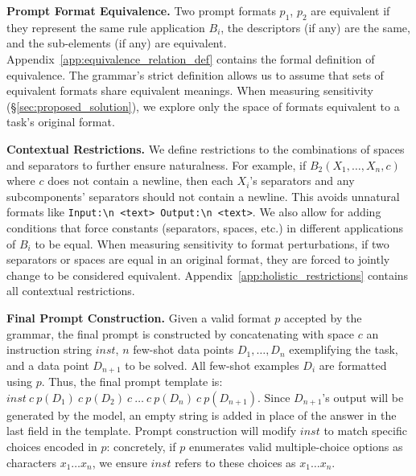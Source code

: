 \documentclass{article} %
\newcommand{\prompt}[1]{{\small{\texttt{#1}}}}
\renewcommand{\paragraph}[1]{\textbf{#1}}
\begin{document}
\paragraph{Prompt Format Equivalence.} 
Two prompt formats $p_1$, $p_2$ are equivalent if they represent the same rule application $B_i$, the descriptors (if any) are the same, and the sub-elements (if any) are equivalent. 
Appendix~\ref{app:equivalence_relation_def} contains the formal definition of equivalence. 
The grammar's strict definition allows us to assume that sets of equivalent formats share equivalent meanings. 
When measuring sensitivity (\S\ref{sec:proposed_solution}), we explore only the space of formats equivalent to a task's original format. 


\paragraph{Contextual Restrictions.} We define restrictions to the combinations of spaces and separators to further ensure naturalness. For example, if $B_2(X_1,\!\ldots,\!X_n,\!c)$ where $c$ does not contain a newline, then each $X_i$'s separators and any subcomponents' separators should not contain a newline. 
This avoids unnatural formats like \prompt{Input:\textbackslash n <text> Output:\textbackslash n <text>}. 
We also allow for adding conditions that force constants (separators, spaces, etc.) in different applications of $B_i$ to be equal. When measuring sensitivity to format perturbations, if two separators or spaces are equal in an original format, they are forced to jointly change to be considered equivalent. 
Appendix~\ref{app:holistic_restrictions} contains all contextual restrictions.

\paragraph{Final Prompt Construction.} Given a valid format $p$ accepted by the grammar, the final prompt is constructed by concatenating with space $c$ an instruction string $inst$, $n$ few-shot data points $D_1,\ldots,D_n$ exemplifying the task, and a data point $D_{n+1}$ to be solved. 
All few-shot examples $D_i$ are formatted using $p$. 
Thus, the final prompt template is: $inst\ c \ p(D_1)\ c \ p(D_2)\ c \ \ldots \ c \ p(D_n)\ c \ p(D_{n+1})$.
Since $D_{n+1}$'s output will be generated by the model, an empty string is added in place of the answer in the last field in the template.  %
Prompt construction will modify $inst$ to match specific choices encoded in $p$: concretely, if $p$ enumerates valid multiple-choice options as characters $x_1\ldots x_n$, we ensure $inst$ refers to these choices as $x_1\ldots x_n$.
\end{document}

